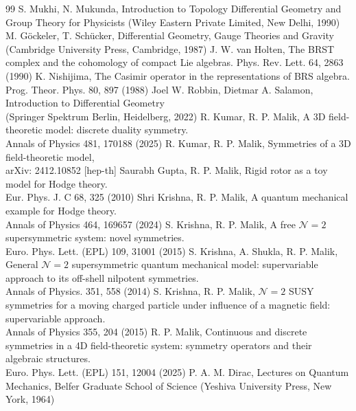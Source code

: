 \documentclass[12pt]{article}
\begin{document}
{\begin{thebibliography}{99}
 S. Mukhi, N. Mukunda, Introduction to Topology Differential Geometry and Group Theory for Physicists 
                (Wiley Eastern Private Limited, New Delhi, 1990)
 M. G{\" o}ckeler, T. Sch{\" u}cker, Differential Geometry, Gauge Theories and Gravity\\ (Cambridge University Press, Cambridge, 1987)
 J. W. van Holten, The BRST complex and the cohomology of compact Lie algebras.
                Phys. Rev. Lett. 64, 2863 (1990) 
 K. Nishijima, The Casimir operator in the representations of BRS algebra.\\ Prog. Theor. Phys. 80, 897 (1988) 
 Joel W. Robbin, Dietmar A. Salamon, Introduction to Differential Geometry \\(Springer Spektrum Berlin, Heidelberg, 2022)
 R. Kumar, R. P. Malik,  A 3D field-theoretic model: discrete duality symmetry.\\ Annals of Physics 481, 170188 (2025)
 R. Kumar, R. P. Malik, Symmetries of a 3D field-theoretic model, \\arXiv: 2412.10852  [hep-th]
  Saurabh Gupta, R. P. Malik, Rigid rotor as a toy model for Hodge theory.\\ Eur. Phys. J. C 68, 325 (2010)
  Shri Krishna, R. P. Malik, A quantum mechanical example for Hodge theory.\\
                 Annals of Physics 464, 169657 (2024)
  S. Krishna, R. P. Malik, A free ${\mathcal N} = 2$  supersymmetric system: novel symmetries.\\
                 Euro. Phys. Lett. (EPL) 109, 31001  (2015)                
 S. Krishna, A. Shukla, R. P. Malik, General ${\mathcal N} = 2$  supersymmetric quantum mechanical model: supervariable approach to 
                its off-shell nilpotent symmetries. \\Annals of Physics. 351,  558 (2014)
 S. Krishna, R. P. Malik, ${\mathcal N} = 2$ SUSY symmetries for a moving charged particle
                under influence of a magnetic field: supervariable approach.\\ Annals of Physics 355, 204 (2015)                
 R. P. Malik, Continuous and discrete symmetries in a  4D field-theoretic system:  symmetry operators and their algebraic structures.\\
                Euro. Phys. Lett. (EPL) 151, 12004 (2025)  
 P. A. M. Dirac, Lectures on Quantum Mechanics, Belfer Graduate School of Science (Yeshiva University Press, New York, 1964)

\end{thebibliography}}
\end{document}
